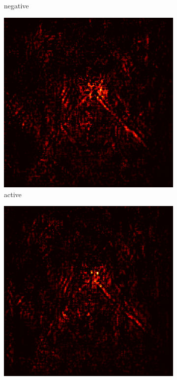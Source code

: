 \documentclass[preprint,12pt]{elsarticle}
\begin{document}
\begin{figure}
\begin{subfigure}{0.14\textwidth}
        \caption{negative}
    \end{subfigure}
    \hfill
    \begin{subfigure}{0.14\textwidth}
        \centering
        \includegraphics[width=\linewidth]{../visualizations/examples/imagenette/resnet18/active_saliency_map/7.png}
        \caption{active}
    \end{subfigure}
    \hfill
    \begin{subfigure}{0.14\textwidth}
        \centering
        \includegraphics[width=\linewidth]{../visualizations/examples/imagenette/resnet18/inactive_saliency_map/7.png}

\end{subfigure}
\end{figure}
\end{document}
